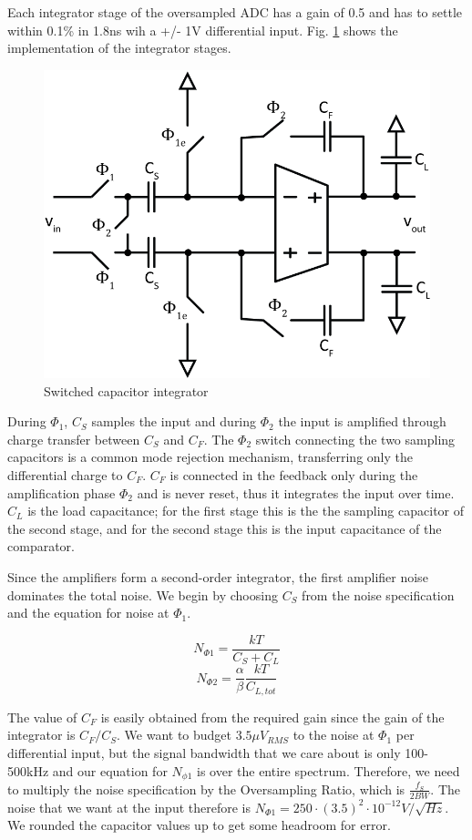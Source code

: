 \documentclass[conference]{IEEEtran}
\begin{document}
Each integrator stage of the oversampled ADC has a gain of 0.5 and has to settle within 0.1\% in 1.8ns wih a +/- 1V differential input. Fig. \ref{fig:int} shows the implementation of the integrator stages.

\begin{figure}[h]
\centering
\includegraphics[width=0.75\linewidth]{illus/integrator}
\caption{Switched capacitor integrator}
\label{fig:int}
\end{figure}

During $\Phi_1$, $C_S$ samples the input and during $\Phi_2$ the input is amplified through charge transfer between $C_S$ and $C_F$. The $\Phi_2$ switch connecting the two sampling capacitors is a common mode rejection mechanism, transferring only the differential charge to $C_F$. $C_F$ is connected in the feedback only during the amplification phase $\Phi_2$ and is never reset, thus it integrates the input over time. $C_L$ is the load capacitance; for the first stage this is the the sampling capacitor of the second stage, and for the second stage this is the input capacitance of the comparator.

Since the amplifiers form a second-order integrator, the first amplifier noise dominates the total noise. We begin by choosing $C_S$ from the noise specification and the equation for noise at $\Phi_1$. 

$$N_{\Phi 1} = \frac{kT}{C_S + C_L}$$
$$N_{\Phi 2} = \frac{\alpha}{\beta}\frac{kT}{C_{L,tot}}$$

The value of $C_F$ is easily obtained from the required gain since the gain of the integrator is $C_F/C_S$. We want to budget $3.5 \mu$$V_{RMS}$ to the noise at $\Phi_1$ per differential input, but the signal bandwidth that we care about is only 100-500kHz and our equation for $N_{\phi 1}$ is over the entire spectrum. Therefore, we need to multiply the noise specification by the Oversampling Ratio, which is $\frac{f_S}{2BW}$. The noise that we want at the input therefore is $N_{\Phi 1}=250 \cdot (3.5)^2 \cdot 10^{-12} V/\sqrt{Hz}$. We rounded the capacitor values up to get some headroom for error.
\end{document}
